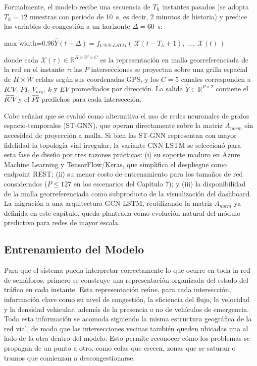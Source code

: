 \documentclass[12pt,a4paper,oneside]{report}
\newenvironment{centeredmath}
  {\begin{center}\begin{adjustbox}{max width=0.96\linewidth}\(\displaystyle}
  {\)\end{adjustbox}\end{center}}
\begin{document}
Formalmente, el modelo recibe una secuencia de \(T_{h}\) instantes pasados (se adopta \(T_{h} = 12\) muestras con periodo de 10~s, es decir, 2 minutos de historia) y predice las variables de congestión a un horizonte \(\Delta = 60\)~s:

\begin{centeredmath}
\widehat{Y}(t + \Delta) = f_{CNN\text{-}LSTM}\!\left(\, \mathcal{X}(t - T_{h} + 1),\ \ldots,\ \mathcal{X}(t) \,\right)
\end{centeredmath}

donde cada \(\mathcal{X}(\tau) \in \mathbb{R}^{H \times W \times C}\) es la representación en malla georreferenciada de la red en el instante \(\tau\): las \(P\) intersecciones se proyectan sobre una grilla espacial de \(H \times W\) celdas según sus coordenadas GPS, y los \(C = 5\) canales corresponden a \(ICV\), \(PI\), \(V_{avg}\), \(k\) y \(EV\) promediados por dirección. La salida \(\widehat{Y} \in \mathbb{R}^{P \times 2}\) contiene el \(\widehat{ICV}\) y el \(\widehat{PI}\) predichos para cada intersección.

Cabe señalar que se evaluó como alternativa el uso de redes neuronales de grafos espacio-temporales (ST-GNN), que operan directamente sobre la matriz \(A_{norm}\) sin necesidad de proyección a malla. Si bien las ST-GNN representan con mayor fidelidad la topología vial irregular, la variante CNN-LSTM se seleccionó para esta fase de diseño por tres razones prácticas: (i) su soporte maduro en Azure Machine Learning y TensorFlow/Keras, que simplifica el despliegue como endpoint REST; (ii) su menor costo de entrenamiento para los tamaños de red considerados (\(P \leq 127\) en los escenarios del Capítulo 7); y (iii) la disponibilidad de la malla georreferenciada como subproducto de la visualización del dashboard. La migración a una arquitectura GCN-LSTM, reutilizando la matriz \(A_{norm}\) ya definida en este capítulo, queda planteada como evolución natural del módulo predictivo para redes de mayor escala.

\subsection{Entrenamiento del Modelo}\label{entrenamiento-del-modelo}

Para que el sistema pueda interpretar correctamente lo que ocurre en toda la red de semáforos, primero se construye una representación organizada del estado del tráfico en cada instante. Esta representación reúne, para cada intersección, información clave como su nivel de congestión, la eficiencia del flujo, la velocidad y la densidad vehicular, además de la presencia o no de vehículos de emergencia. Toda esta información se acomoda siguiendo la misma estructura geográfica de la red vial, de modo que las intersecciones vecinas también queden ubicadas una al lado de la otra dentro del modelo. Esto permite reconocer cómo los problemas se propagan de un punto a otro, como colas que crecen, zonas que se saturan o tramos que comienzan a descongestionarse.
\end{document}
